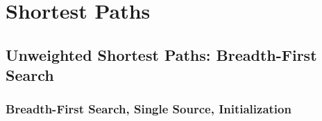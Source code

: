 \section{Shortest Paths}


\begin{comment}
      \subsection{Driver Interface}

      \andrew{I am not sure we should have the unified interface.  We need to be more parsimonious in our interfaces.  Users can read the documentation for which algorithms to use.  And, if they are using graph algorithms, we should assume a certain level of knowledge about graph algorithms.  OTOH, it is only a handful of algorithms.}

      \andrew{I am also not sure we should have ``shortest distance'' variants.  That doubles the number of functions in the interface.
            For each function we have shortest paths, s-t paths, multi-source paths, parallel = 6X variants for each base function.  If we add shortest distances, that will make 12X.  OTOH, we could consider not having s-t paths or not having multi-source paths -- which would leave 4X for each base function.  However, I think people will want s-t and multi-source.
      }
      \phil{\tcode{dijkstra_shortest_distances} includes predecessor and distances, so excluding \tcode{dijkstra_shortest_distances} won't impact 
      the user much.}


      {\small
            
      }

      \andrew{The variety of algorithms was inspired by networkx....  Which also had ``distance'' variants.}

      \phil{I assume \tcode{adjacency_list_graph} is the same as our \tcode{adjacency_list}. \tcode{bidirectional_adjacency_list_graph} is new; what to do with it?}
\end{comment}


\subsection{Unweighted Shortest Paths: Breadth-First Search}

\subsubsection{Breadth-First Search, Single Source, Initialization}

